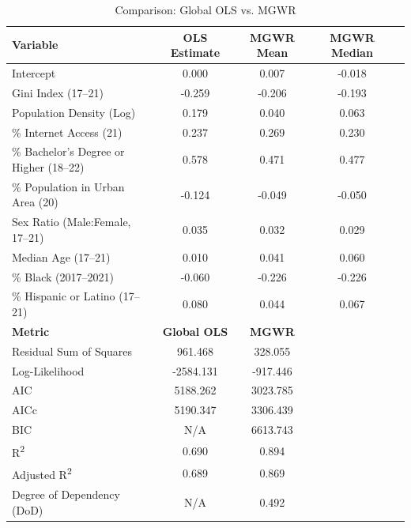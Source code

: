 \documentclass[
]{article}
\begin{document}
\begin{table}[H]
\renewcommand{\arraystretch}{1.3}
\centering
\caption{Comparison: Global OLS vs. MGWR}
\label{tab:ols_vs_mgwr}
\begin{tabular}{lcccc}
\hline
\textbf{Variable} & \textbf{OLS Estimate} & \textbf{MGWR Mean} & \textbf{MGWR Median} \\ \hline
Intercept                & 0.000 & 0.007 & -0.018 \\ 
Gini Index (17–21)       & -0.259 & -0.206 & -0.193 \\ 
Population Density (Log) & 0.179 & 0.040 & 0.063 \\ 
\% Internet Access (21)  & 0.237 & 0.269 & 0.230 \\ 
\% Bachelor's Degree or Higher (18–22) & 0.578 & 0.471 & 0.477 \\ 
\% Population in Urban Area (20) & -0.124 & -0.049 & -0.050 \\ 
Sex Ratio (Male:Female, 17–21) & 0.035 & 0.032 & 0.029 \\ 
Median Age (17–21)       & 0.010 & 0.041 & 0.060 \\ 
\% Black (2017–2021)     & -0.060 & -0.226 & -0.226 \\ 
\% Hispanic or Latino (17–21) & 0.080 & 0.044 & 0.067 \\ \hline
\textbf{Metric} & \textbf{Global OLS} & \textbf{MGWR} \\ \hline
Residual Sum of Squares  & 961.468 & 328.055 \\
Log-Likelihood           & -2584.131 & -917.446 \\
AIC                      & 5188.262 & 3023.785 \\
AICc                     & 5190.347 & 3306.439 \\
BIC                      & N/A & 6613.743 \\
R\textsuperscript{2}     & 0.690 & 0.894 \\
Adjusted R\textsuperscript{2} & 0.689 & 0.869 \\
Degree of Dependency (DoD) & N/A & 0.492 \\ \hline
\end{tabular}
\end{table}
\end{document}
